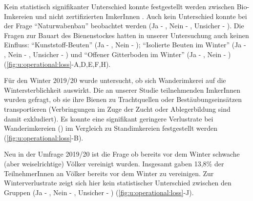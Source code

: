 Kein statistisch signifikanter Unterschied konnte festgestellt werden zwischen Bio-Imkereien  und nicht zertifizierten ImkerInnen . Auch kein Unterschied konnte bei der Frage \enquote{Naturwabenbau} beobachtet werden (Ja - , Nein - , Unsicher - ). Die Fragen zur Bauart des Bienenstockes hatten in unserer Untersuchung auch keinen Einfluss: \enquote{Kunststoff-Beuten} (Ja - , Nein - ); \enquote{Isolierte Beuten im Winter} (Ja - , Nein - , Unsicher - ) und \enquote{Offener Gitterboden im Winter} (Ja - , Nein - ) (\cref{fig:u:operational:loss}-A,D,E,F,H).

\label{ss:stand_wander:U}

Für den Winter 2019/20 wurde untersucht, ob sich Wanderimkerei auf die Wintersterblichkeit auswirkt. Die an unserer Studie teilnehmenden ImkerInnen wurden gefragt, ob sie ihre Bienen zu Trachtquellen oder Bestäubungseinsätzen transportieren (Verbringungen im Zuge der Zucht oder Ablegerbildung sind damit exkludiert).
\newline
Es konnte eine signifikant geringere Verlustrate bei Wanderimkereien () im Vergleich zu Standimkereien  festgestellt werden (\cref{fig:u:operational:loss}-B). 

\label{ss:vereinigung:U}

Neu in der Umfrage 2019/20 ist die Frage ob bereits vor dem Winter schwache (aber weiselrichtige) Völker vereinigt wurden. Insgesamt gaben 13,8\% der TeilnehmerInnen an Völker bereits vor dem Winter zu vereinigen. Zur Winterverlustrate zeigt sich hier kein statistischer Unterschied zwischen den Gruppen (Ja - , Nein - , Unsicher - ) (\cref{fig:u:operational:loss}-J).

